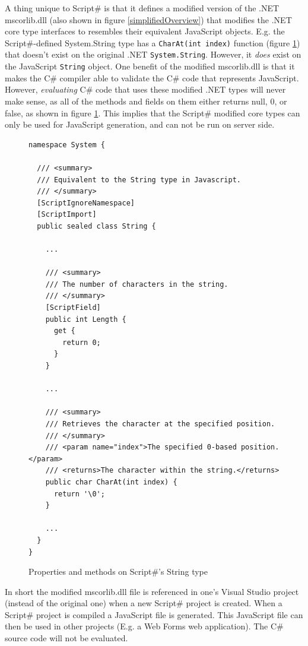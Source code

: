 		A thing unique to Script\# is that it defines a modified version of the .NET mscorlib.dll (also shown in figure \ref{simplifiedOverview}) that modifies the .NET core type interfaces to resembles their equivalent JavaScript objects. E.g. the Script\#-defined System.String type has a \texttt{CharAt(int index)} function (figure \ref{fig:scriptsharp_net_types}) that doesn't exist on the original .NET \texttt{System.String}. However, it \emph{does} exist on the JavaScript \texttt{String} object. One benefit of the modified mscorlib.dll is that it makes the C\# compiler able to validate the C\# code that represents JavaScript. However, \emph{evaluating} C\# code that uses these modified .NET types will never make sense, as all of the methods and fields on them either returns null, 0, or false, as shown in figure \ref{fig:scriptsharp_net_types}. This implies that the Script\# modified core types can only be used for JavaScript generation, and can not be run on server side.

		\begin{figure}
			\begin{lstlisting}[language=CSharp,classoffset=1,morekeywords={String}]
namespace System {

  /// <summary>
  /// Equivalent to the String type in Javascript.
  /// </summary>
  [ScriptIgnoreNamespace]
  [ScriptImport]
  public sealed class String {

    ...

    /// <summary>
    /// The number of characters in the string.
    /// </summary>
    [ScriptField]
    public int Length {
      get {
        return 0;
      }
    }

    ...

    /// <summary>
    /// Retrieves the character at the specified position.
    /// </summary>
    /// <param name="index">The specified 0-based position.</param>
    /// <returns>The character within the string.</returns>
    public char CharAt(int index) {
      return '\0';
    }

    ...
  }
}

			\end{lstlisting}
			\caption{Properties and methods on Script\#'s String type}
			\label{fig:scriptsharp_net_types}
		\end{figure}

		In short the modified mscorlib.dll file is referenced in one's Visual Studio project (instead of the original one) when a new Script\# project is created. When a Script\# project is compiled a JavaScript file is generated. This JavaScript file can then be used in other projects (E.g. a Web Forms web application). The C\# source code will not be evaluated.



